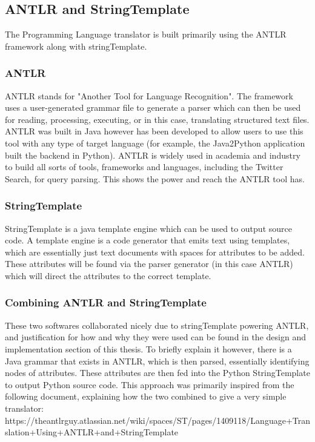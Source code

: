 \documentclass{l4proj}
\begin{document}
\subsection{ANTLR and StringTemplate}
The Programming Language translator is built primarily using the ANTLR framework along with stringTemplate.

\subsubsection{ANTLR}

ANTLR stands for "Another Tool for Language Recognition". The framework uses a user-generated grammar file to generate a parser which can then be used for reading, processing, executing, or in this case, translating structured text files. ANTLR was built in Java however has been developed to allow users to use this tool with any type of target language (for example, the Java2Python application built the backend in Python). ANTLR is widely used in academia and industry to build all sorts of tools, frameworks and languages, including the Twitter Search, for query parsing. This shows the power and reach the ANTLR tool has.

\subsubsection{StringTemplate}
StringTemplate is a java template engine which can be used to output source code. A template engine is a code generator that emits text using templates, which are essentially just text documents with spaces for attributes to be added. These attributes will be found via the parser generator (in this case ANTLR) which will direct the attributes to the correct template.
\subsubsection{Combining ANTLR and StringTemplate}
These two softwares collaborated nicely due to stringTemplate powering ANTLR, and justification for how and why they were used can be found in the design and implementation section of this thesis.
To briefly explain it however, there is a Java grammar that exists in ANTLR, which is then parsed, essentially identifying nodes of attributes. These attributes are then fed into the Python StringTemplate to output Python source code. This approach was primarily inspired from the following document, explaining how the two combined to give a very simple translator:
https://theantlrguy.atlassian.net/wiki/spaces/ST/pages/1409118/Language+Translation+Using+ANTLR+and+StringTemplate
\end{document}
